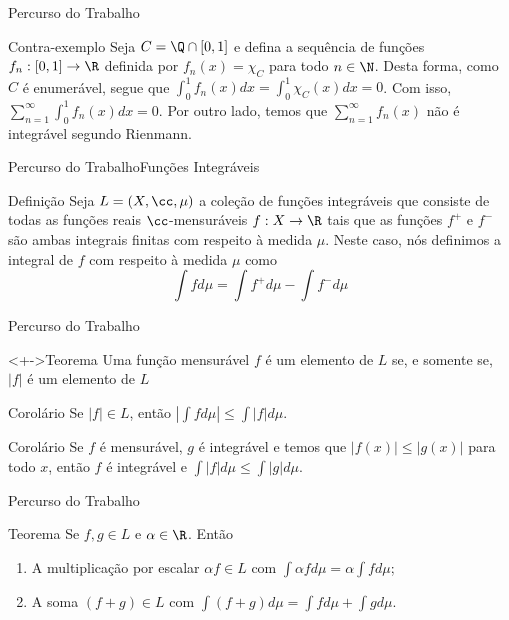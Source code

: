 	\begin{frame}{Percurso do Trabalho}
		\begin{block}{Contra-exemplo}
			\justify Seja $C = \Q \cap [0,1]$ e defina a sequência de funções $f_n: [0,1] \to \R$ definida por $f_n(x) = \chi_C$ para todo $n \in \N$.
			Desta forma, como $C$ é enumerável, segue que $\displaystyle \int_{0}^{1} f_n(x)dx = \int_{0}^{1} \chi_C(x) dx = 0$.
			Com isso, $\sum_{n = 1}^\infty \int_{0}^{1} f_n(x)dx = 0$.
			Por outro lado, temos que
			$
			\sum_{n = 1}^\infty f_n(x)
			$
			não é integrável segundo Rienmann.
		\end{block}
	\end{frame}

	\begin{frame}{Percurso do Trabalho}{Funções Integráveis}
		\begin{block}{Definição}
			\justify Seja $L = (X, \cc, \mu)$ a coleção de funções integráveis que consiste de todas as funções reais $\cc$-mensuráveis $f:X \to \R$ tais que as funções
			$f^+$ e $f^-$ são ambas integrais finitas com respeito à medida $\mu$.
			Neste caso, nós definimos a integral de $f$ com respeito à medida $\mu$ como
			$$
			\int fd\mu
			= \int f^+ d\mu - \int f^- d\mu
			$$
		\end{block}
	\end{frame}
	
	\begin{frame}{Percurso do Trabalho}
		\begin{block}<+->{Teorema}
			Uma função mensurável $f$ é um elemento de $L$ se, e somente se, $|f|$ é um elemento de $L$
		\end{block}
		\begin{block}{Corolário}
			Se $|f| \in L$, então $\displaystyle \left|\int f d\mu\right| \leq \int |f| d\mu$.
		\end{block}
		\begin{block}{Corolário}
			Se $f$ é mensurável, $g$ é integrável e temos que $|f(x)| \leq |g(x)|$ para todo $x$, então  $f$ é integrável e $\displaystyle \int |f| d\mu \leq \int |g| d\mu$.
		\end{block}
	\end{frame}


	\begin{frame}{Percurso do Trabalho}
		\begin{block}{Teorema}
			Se $f, g \in L$ e $\alpha \in \R$. Então
			\begin{enumerate}[<+->]
				\item A multiplicação por escalar $\alpha f \in L$ com $\displaystyle \int \alpha fd\mu = \alpha \int f d\mu$;
				\item A soma $(f + g) \in L$ com $\displaystyle \int (f + g) d\mu = \int f d\mu + \int g d\mu$. 
			\end{enumerate}
		\end{block}
	\end{frame}

